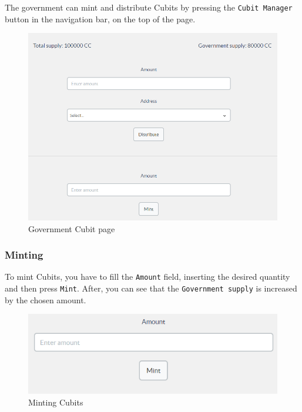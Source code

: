 	The government can mint and distribute Cubits\glosp{} by pressing the
	\texttt{Cubit Manager} button in the navigation bar, on the top of the page.
	\begin{figure}[H]
		\includegraphics[width=15cm]{res/images/cubit_manager.png}
		\centering
		\caption{Government Cubit page}
	\end{figure}
		\subsubsection{Minting}
		To mint Cubits\glo{}, you have to fill the \texttt{Amount} field,
		inserting the desired quantity and then press \texttt{Mint}. After,
		you can see that the \texttt{Government supply} is increased by the
		chosen amount.
		\begin{figure}[H]
			\includegraphics[width=15cm]{res/images/minting_cubits.png}
			\centering
			\caption{Minting Cubits}
		\end{figure}
